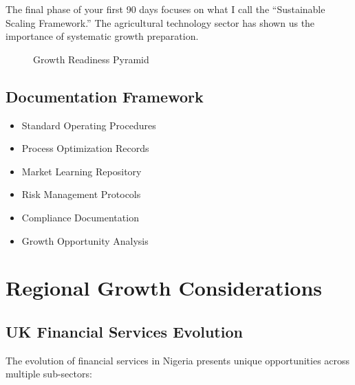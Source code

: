The final phase of your first 90 days focuses on what I call the ``Sustainable Scaling Framework.'' The agricultural technology sector has shown us the importance of systematic growth preparation.

\begin{figure}[htbp]
    \centering
    \caption{Growth Readiness Pyramid}
    \label{fig:growth-pyramid}
\end{figure}

\subsection{Documentation Framework}\label{subsec:documentation-framework}
\begin{tcolorbox}[colback=white,colframe=primarydark,title=\textbf{Critical Documentation Areas}]
\begin{itemize}
    \item Standard Operating Procedures
    \item Process Optimization Records
    \item Market Learning Repository
    \item Risk Management Protocols
    \item Compliance Documentation
    \item Growth Opportunity Analysis
\end{itemize}
\end{tcolorbox}

\section{Regional Growth Considerations}\label{sec:regional-growth}

\subsection{UK Financial Services Evolution}\label{subsec:uk-financial}
The evolution of financial services in Nigeria presents unique opportunities across multiple sub-sectors:

